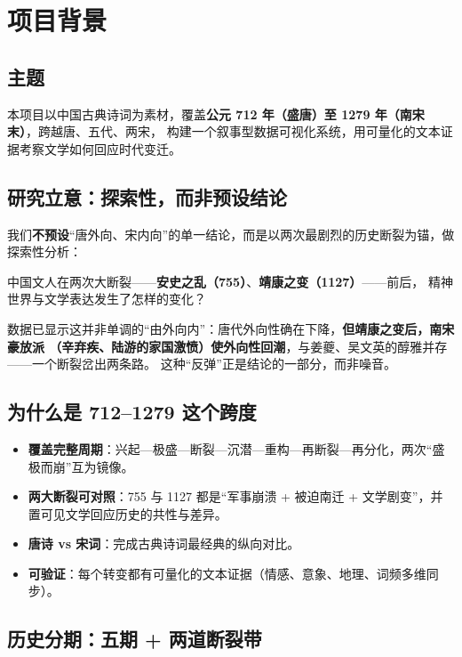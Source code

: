 \section{项目背景}

\subsection{主题}

本项目以中国古典诗词为素材，覆盖\textbf{公元 712 年（盛唐）至 1279 年（南宋末）}，跨越唐、五代、两宋，
构建一个叙事型数据可视化系统，用可量化的文本证据考察文学如何回应时代变迁。

\subsection{研究立意：探索性，而非预设结论}

我们\textbf{不预设}“唐外向、宋内向”的单一结论，而是以两次最剧烈的历史断裂为锚，做探索性分析：

\begin{keybox}[统领问题]
中国文人在两次大断裂——\textbf{安史之乱（755）}、\textbf{靖康之变（1127）}——前后，
精神世界与文学表达发生了怎样的变化？
\end{keybox}

数据已显示这并非单调的“由外向内”：唐代外向性确在下降，\textbf{但靖康之变后，南宋豪放派
（辛弃疾、陆游的家国激愤）使外向性回潮}，与姜夔、吴文英的醇雅并存——一个断裂岔出两条路。
这种“反弹”正是结论的一部分，而非噪音。

\subsection{为什么是 712–1279 这个跨度}

\begin{itemize}[leftmargin=*, itemsep=0.3em]
    \item \textbf{覆盖完整周期}：兴起—极盛—断裂—沉潜—重构—再断裂—再分化，两次“盛极而崩”互为镜像。
    \item \textbf{两大断裂可对照}：755 与 1127 都是“军事崩溃 + 被迫南迁 + 文学剧变”，并置可见文学回应历史的共性与差异。
    \item \textbf{唐诗 vs 宋词}：完成古典诗词最经典的纵向对比。
    \item \textbf{可验证}：每个转变都有可量化的文本证据（情感、意象、地理、词频多维同步）。
\end{itemize}

\subsection{历史分期：五期 + 两道断裂带}

